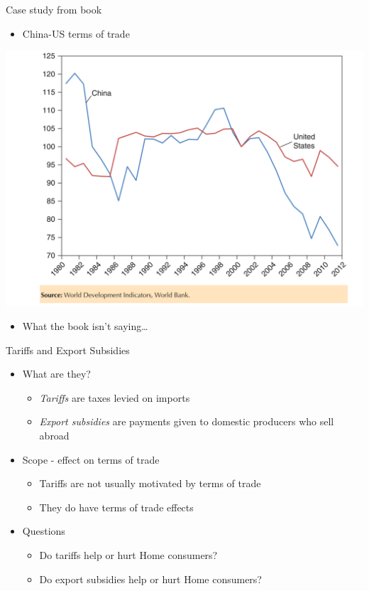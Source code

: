 \documentclass[ignorenonframetext,]{beamer}
\begin{document}
\begin{frame}{Case study from book}

    \begin{itemize}
        \item China-US terms of trade
    \end{itemize}
    \includegraphics[scale=0.20]{china_us_tot.png}
    \begin{itemize}
        \item What the book isn't saying\dots
    \end{itemize}

\end{frame}

\begin{frame}{Tariffs and Export Subsidies}

    \begin{itemize}
        \item What are they?
        \begin{itemize}
            \item \emph{Tariffs} are taxes levied on imports
            \item \emph{Export subsidies} are payments given to domestic producers who sell abroad
        \end{itemize}
        \item Scope - effect on terms of trade
        \begin{itemize}
            \item Tariffs are not usually motivated by terms of trade
            \item They do have terms of trade effects
        \end{itemize}
        \item Questions
        \begin{itemize}
            \item Do tariffs help or hurt Home consumers?
            \item Do export subsidies help or hurt Home consumers?
        \end{itemize}
    \end{itemize}

\end{frame}
\end{document}
